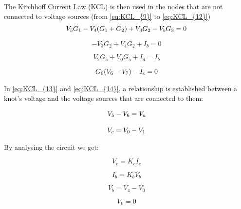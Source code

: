 The Kirchhoff Current Law (KCL) is then used in the nodes that are not connected
to voltage sources (from \ref{eq:KCL_{9}} to \ref{eq:KCL_{12}})
\vspace{0.1cm}
\begin{equation}
    V_{5} G_{1} - V_{4} (G_{1} + G_{2}) + V_{3} G_{2} - V_{b} G_{3} = 0
    \label{eq:KCL_{9}}
\end{equation}

\begin{equation}
    -V_{3} G_{2} + V_{4} G_{2} + I_{b} = 0
\end{equation}

\begin{equation}
    V_{2} G_{5} + V_{0} G_{5} + I_{d} = I_{b}
\end{equation}

\begin{equation}
    G_{6} (V_{6} - V_{7}) - I_{c} = 0
    \label{eq:KCL_{12}}
\end{equation}
\vspace{0.5cm}

\pagebreak

In \ref{eq:KCL_{13}} and \ref{eq:KCL_{14}}, a relationship is established between
a knot's voltage and the voltage sources that are connected to them:

\begin{equation}
    V_{5} - V_{6} = V_{a}
    \label{eq:KCL_{13}}
\end{equation}

\begin{equation}
    V_{c} = V_{0} - V_{1}
    \label{eq:KCL_{14}}
\end{equation}



\vspace{0.5cm}

By analysing the circuit we get:

\vspace{0.5cm}
\begin{equation}
    V_{c} = K_{c} I_{c}
\end{equation}

\begin{equation}
    I_{b} = K_{b} V_{b}
\end{equation}

\begin{equation}
    V_{b} = V_{4} - V_{0}
\end{equation}

\begin{equation}
    V_{0} = 0
\end{equation}


